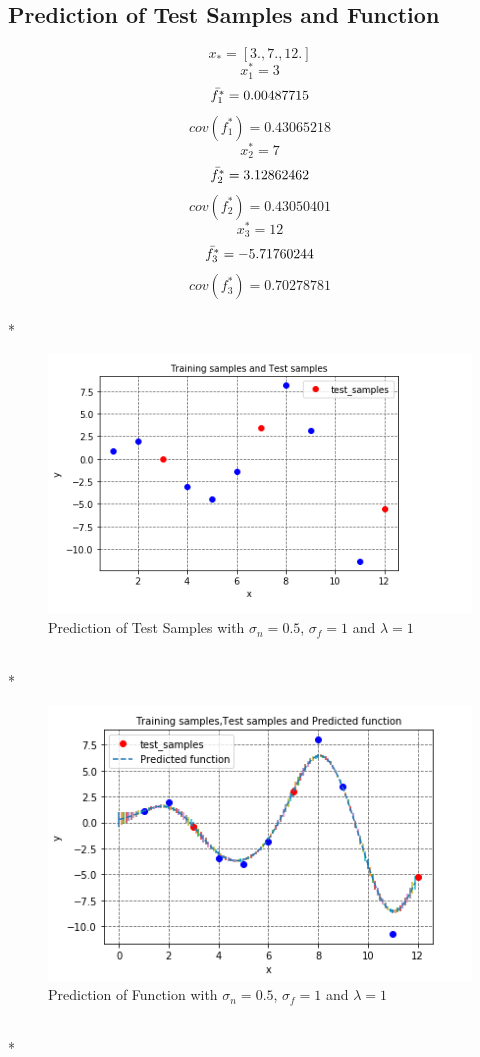 \documentclass{article}
\begin{document}
\subsection{Prediction of Test Samples and Function}
$$ x_{*} = [3., 7., 12.]$$
$$x_1^* = 3$$
$$\Bar{f_1^{*}}= 0.00487715$$
$$cov(f_1^{*}) = 0.43065218$$
$$x_2^* = 7$$
$$\Bar{f_2^{*}}= 3.12862462$$
$$cov(f_2^{*}) = 0.43050401$$
$$x_3^* = 12$$
$$\Bar{f_3^{*}}= -5.71760244$$
$$cov(f_3^{*}) = 0.70278781$$
\\*
\begin{figure}[]
    \centering
    \includegraphics[width=12cm]{Capture2.PNG}
    \caption{Prediction of Test Samples with $\sigma_n = 0.5$, $\sigma_f=1$ and $\lambda=1$}
    \label{fig:Test samples}
\end{figure}
\\*
\begin{figure}[]
    \centering
    \includegraphics[width=12cm]{Capture3.PNG}
    \caption{Prediction of Function with $\sigma_n = 0.5$, $\sigma_f=1$ and $\lambda=1$}
    \label{fig:Function prediction}
\end{figure}
\\*
\end{document}
